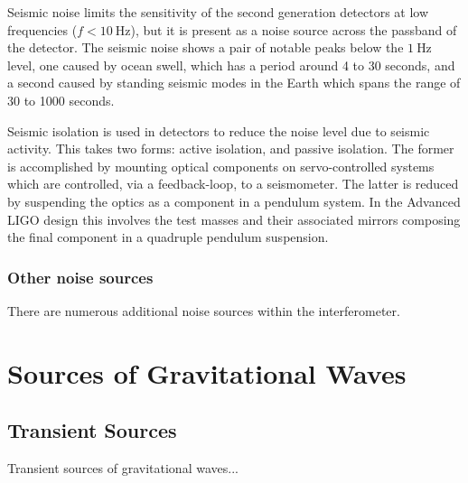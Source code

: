 \documentclass{kentigern}
\begin{document}

Seismic noise limits the sensitivity of the second generation
detectors at low frequencies ($f < \SI{10}{\hertz}$), but it is
present as a noise source across the passband of the detector. The
seismic noise shows a pair of notable peaks below the $\SI{1}{\hertz}$
level, one caused by ocean swell, which has a period around 4 to 30
seconds, and a second caused by standing seismic modes in the Earth
which spans the range of 30 to 1000 seconds.

Seismic isolation is used in detectors to reduce the noise level due
to seismic activity. This takes two forms: active isolation, and
passive isolation. The former is accomplished by mounting optical
components on servo-controlled systems which are controlled, via a
feedback-loop, to a seismometer. The latter is reduced by suspending
the optics as a component in a pendulum system. In the Advanced LIGO
design this involves the test masses and their associated mirrors
composing the final component in a quadruple pendulum suspension.



\subsection{Other noise sources}
\label{sec:other-noise-sources}

There are numerous additional noise sources within the interferometer.

\chapter{Sources of Gravitational Waves}
\label{cha:sourc-grav-waves}


\section{Transient Sources}
\label{sec:transient-sources}

Transient sources of gravitational waves...

\end{document}
